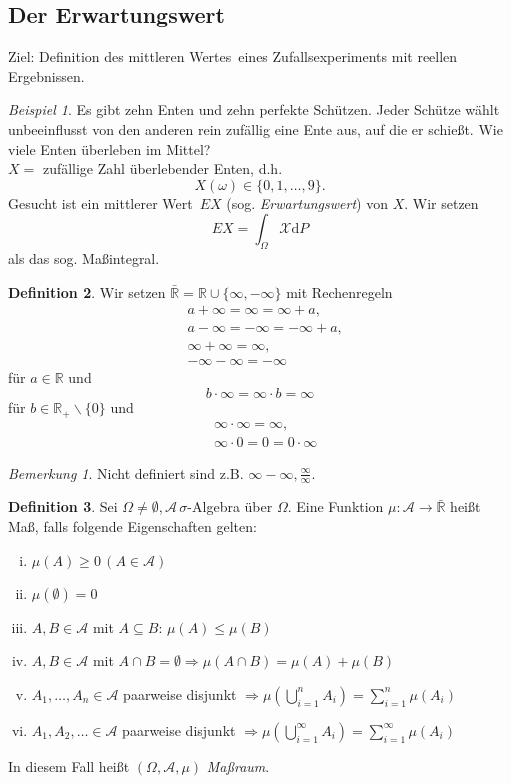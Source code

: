 \documentclass[a4paper,12pt,fleqn]{scrartcl}
\newcommand{\R}{\mathbb{R}}
\newcommand{\m}[1]{\mathcal{ #1 }}
\newcommand{\impl}{\Rightarrow}
\theoremstyle{definition}
\newtheorem{definition}{Definition}[section]
\theoremstyle{plain}
\theoremstyle{remark}
\newtheorem*{bemerkung}{Bemerkung}
\newtheorem{beispiel}[definition]{Beispiel}
\begin{document}
\subsection{Der Erwartungswert}

Ziel: Definition des \glqq mittleren Wertes\grqq \, eines Zufallsexperiments mit reellen Ergebnissen.
\begin{beispiel}
Es gibt zehn Enten und zehn perfekte Schützen. Jeder Schütze wählt unbeeinflusst von den anderen rein zufällig eine Ente aus, auf die er schießt. Wie viele Enten überleben im Mittel? \\
$X=$ zufällige Zahl überlebender Enten, d.h.
\[X(\omega) \in \{0,1, \ldots, 9\}.\]
Gesucht ist ein \glqq mittlerer Wert\grqq \, $EX$ (sog. \emph{Erwartungswert}) von $X$. Wir setzen
\[EX = \int_\Omega \m{X} \mathrm{d}P\]
als das sog. Maßintegral.
\end{beispiel}
\begin{definition}
Wir setzen $\bar{\R} = \R \cup \{\infty, - \infty\}$ mit Rechenregeln
\begin{align*}
&a + \infty = \infty = \infty + a, \\
&a - \infty = - \infty = - \infty + a, \\
&\infty + \infty = \infty, \\
&- \infty - \infty = - \infty
\end{align*}
für $a \in \R$ und
\[b \cdot \infty = \infty \cdot b = \infty\]
für $b \in \R_+ \backslash \{0\}$ und
\begin{align*}
&\infty \cdot \infty = \infty, \\
&\infty \cdot 0 = 0 = 0 \cdot \infty
\end{align*}
\end{definition}
\begin{bemerkung}
Nicht definiert sind z.B. $\infty - \infty, \frac{\infty}{\infty}.$
\end{bemerkung}
\begin{definition}
Sei $\Omega \neq \emptyset, \m{A} \, \sigma$-Algebra über $\Omega$. Eine Funktion $\mu: \m{A} \rightarrow \bar{\R}$ heißt Maß, falls folgende Eigenschaften gelten:
\begin{enumerate}[(i)]
\item $\mu(A) \geq 0 \, (A \in \m{A})$
\item $\mu(\emptyset) = 0$
\item $A, B \in \m{A}$ mit $A \subseteq B$: $\mu(A) \leq \mu(B)$
\item $A, B \in \m{A}$ mit $A \cap B = \emptyset \impl \mu(A \cap B) = \mu(A) + \mu(B)$
\item $A_1, \ldots , A_n \in \m{A}$ paarweise disjunkt $\impl \mu(\bigcup_{i=1}^n A_i) = \sum_{i=1}^n \mu(A_i)$
\item $A_1, A_2, \ldots \in \m{A}$ paarweise disjunkt $\impl \mu(\bigcup_{i=1}^\infty A_i) = \sum_{i=1}^\infty \mu(A_i)$
\end{enumerate}
In diesem Fall heißt $(\Omega, \m{A}, \mu)$ \emph{Maßraum}.
\end{definition}
\end{document}
